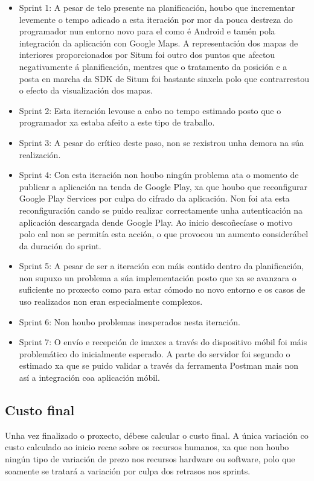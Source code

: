 \begin{itemize}
	\item Sprint 1: A pesar de telo presente na planificación, houbo que incrementar levemente o tempo adicado a esta iteración por mor da pouca destreza do programador nun entorno novo para el como é Android e tamén pola integración da aplicación con Google Maps. A representación dos mapas de interiores proporcionados por Situm foi outro dos puntos que afectou negativamente á planificación, mentres que o tratamento da posición e a posta en marcha da SDK de Situm foi bastante sinxela polo que contrarrestou o efecto da visualización dos mapas.
	\item Sprint 2: Esta iteración levouse a cabo no tempo estimado posto que o programador xa estaba afeito a este tipo de traballo.
	\item Sprint 3: A pesar do crítico deste paso, non se rexistrou unha demora na súa realización.
	\item Sprint 4: Con esta iteración non houbo ningún problema ata o momento de publicar a aplicación na tenda de Google Play, xa que houbo que reconfigurar Google Play Services por culpa do cifrado da aplicación. Non foi ata esta reconfiguración cando se puido realizar correctamente unha autenticación na aplicación descargada dende Google Play. Ao inicio descoñecíase o motivo polo cal non se permitía esta acción, o que provocou un aumento considerábel da duración do sprint.
	\item Sprint 5: A pesar de ser a iteración con máis contido dentro da planificación, non supuxo un problema a súa implementación posto que xa se avanzara o suficiente no proxecto como para estar cómodo no novo entorno e os casos de uso realizados non eran especialmente complexos.
	\item Sprint 6: Non houbo problemas inesperados nesta iteración.
	\item Sprint 7: O envío e recepción de imaxes a través do dispositivo móbil foi máis problemático do inicialmente esperado. A parte do servidor foi segundo o estimado xa que se puido validar a través da ferramenta Postman mais non así a integración coa aplicación móbil.
\end{itemize}

\subsection{Custo final}
Unha vez finalizado o proxecto, débese calcular o custo final. A única variación co custo calculado ao inicio recae sobre os recursos humanos, xa que non houbo ningún tipo de variación de prezo nos recursos hardware ou software, polo que soamente se tratará a variación por culpa dos retrasos nos sprints.

